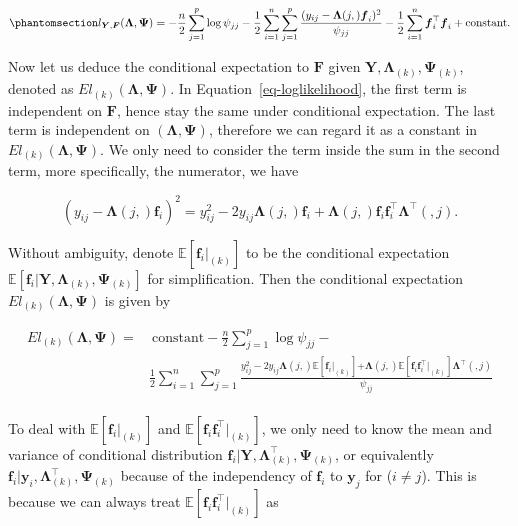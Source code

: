 \documentclass[
  a4paper,
  oneside,
  openany,
  12pt,
  onecolumn]{book}
\theoremstyle{plain}
\theoremstyle{remark}
\begin{document}
\begin{equation}\phantomsection\label{eq-loglikelihood}{
l_{\boldsymbol{Y},\boldsymbol{F}}(\boldsymbol{\Lambda},\boldsymbol{\Psi})=-\frac{n}{2}\sum_{j=1}^p\log{\psi_{jj}}-\frac{1}{2}\sum_{i=1}^n\sum_{j=1}^p\frac{(y_{ij}-\boldsymbol{\Lambda}(j,)\boldsymbol{f}_i)^2}{\psi_{jj}}-\frac{1}{2}\sum_{i=1}^n\boldsymbol{f}_i^\top\boldsymbol{f}_i+\text{constant}.
}\end{equation}

Now let us deduce the conditional expectation to \(\boldsymbol{F}\)
given
\(\boldsymbol{Y},\boldsymbol{\Lambda}_{(k)},\boldsymbol{\Psi}_{(k)}\),
denoted as \(El_{(k)}(\boldsymbol{\Lambda},\boldsymbol{\Psi})\). In
Equation~\ref{eq-loglikelihood}, the first term is independent on
\(\boldsymbol{F}\), hence stay the same under conditional expectation.
The last term is independent on
\((\boldsymbol{\Lambda},\boldsymbol{\Psi})\), therefore we can regard it
as a constant in \(El_{(k)}(\boldsymbol{\Lambda},\boldsymbol{\Psi})\).
We only need to consider the term inside the sum in the second term,
more specifically, the numerator, we have

\[
(y_{ij}-\boldsymbol{\Lambda}(j,)\boldsymbol{f}_i)^2 = y_{ij}^2 - 2 y_{ij}\boldsymbol{\Lambda}(j,)\boldsymbol{f}_i + \boldsymbol{\Lambda}(j,)\boldsymbol{f}_i\boldsymbol{f}_i^\top \boldsymbol{\Lambda}^\top(,j).
\]

Without ambiguity, denote \(\mathbb{E}[\boldsymbol{f}_i|_{(k)}]\) to be
the conditional expectation
\(\mathbb{E}[\boldsymbol{f}_i|\boldsymbol{Y},\boldsymbol{\Lambda}_{(k)},\boldsymbol{\Psi}_{(k)}]\)
for simplification. Then the conditional expectation
\(El_{(k)}(\boldsymbol{\Lambda},\boldsymbol{\Psi})\) is given by

\[
\begin{align*}
El_{(k)}(\boldsymbol{\Lambda},\boldsymbol{\Psi})=& \ \text{constant}-\frac{n}{2}\sum_{j=1}^p\log{\psi_{jj}}-\\
&\frac{1}{2}\sum_{i=1}^n\sum_{j=1}^p\frac{y_{ij}^2 - 2 y_{ij}{\boldsymbol{\Lambda}}(j,)\mathbb{E}[\boldsymbol{f}_i|_{(k)}]\boldsymbol+\boldsymbol{\Lambda}(j,) \mathbb{E}[\boldsymbol{f}_i\boldsymbol{f}^\top_i|_{(k)}]\boldsymbol{\Lambda}^\top(,j)}{\psi_{jj}}\\
\end{align*}
\]

To deal with \(\mathbb{E}[\boldsymbol{f}_i|_{(k)}]\) and
\(\mathbb{E}[\boldsymbol{f}_i\boldsymbol{f}_i^\top|_{(k)}]\), we only
need to know the mean and variance of conditional distribution
\(\boldsymbol{f}_i|\boldsymbol{Y},\boldsymbol{\Lambda}^\top_{(k)},\boldsymbol{\Psi}_{(k)}\),
or equivalently
\(\boldsymbol{f}_i|\boldsymbol{y}_i,\boldsymbol{\Lambda}^\top_{(k)},\boldsymbol{\Psi}_{(k)}\)
because of the independency of \(\boldsymbol{f}_i\) to
\(\boldsymbol{y}_j\) for (\(i\neq j\)). This is because we can always
treat \(\mathbb{E}[\boldsymbol{f}_i\boldsymbol{f}_i^\top|_{(k)}]\) as
\end{document}
